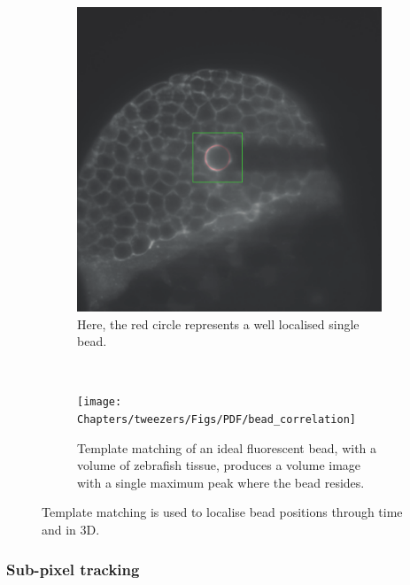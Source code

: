 \begin{figure}[t!]
 \centering
 \begin{subfigure}[t]{0.4\textwidth}
  \centering
  \includegraphics[width=\linewidth]{Chapters/tweezers/Figs/PDF/bead_tracked}
  \caption{Here, the red circle represents a well localised single bead.}\label{fig:bead_tracked}
 \end{subfigure}\\\vspace{\abovecaptionskip}
 \begin{subfigure}[t]{\textwidth}
  \centering
  \texttt{[image: Chapters/tweezers/Figs/PDF/bead\_correlation]}
  \caption{
  Template matching of an ideal fluorescent bead, with a volume of \gls{zebrafish} tissue, produces a volume image with a single maximum peak where the bead resides.
  }\label{fig:bead_correlation}
 \end{subfigure}%
 \caption{Template matching is used to localise bead positions through time and in 3D.
 }
\end{figure}

\subsubsection{Sub-pixel tracking}

